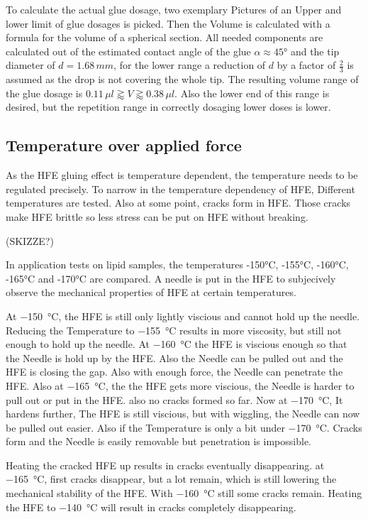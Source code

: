 To calculate the actual glue dosage, two exemplary Pictures of an Upper and lower limit of glue dosages is picked. Then the Volume is calculated with a formula for the volume of a spherical section. All needed components are calculated out of the estimated contact angle of the glue $\alpha \approx 45°$ and the tip diameter of $d = 1.68\,mm$, for the lower range a reduction of $d$ by a factor of $\frac{2}{3}$ is assumed as the drop is not covering the whole tip. The resulting volume range of the glue dosage is $ 0.11\,\mu l \gtrapprox V \gtrapprox 0.38\,\mu l $. Also the lower end of this range is desired, but the repetition range in correctly dosaging lower doses is lower.

\subsection{Temperature over applied force}

As the HFE gluing effect is temperature dependent, the temperature needs to be regulated precisely. To narrow in the temperature dependency of HFE, Different temperatures are tested. Also at some point, cracks form in HFE. Those cracks make HFE brittle so less stress can be put on HFE without breaking.

(SKIZZE?)

In application tests on lipid samples, the temperatures -150°C, -155°C, -160°C, -165°C and -170°C are compared. A needle is put in the HFE to subjecively observe the mechanical properties of HFE at certain temperatures.

At \SI{-150}{\degreeCelsius}, the HFE is still only lightly viscious and cannot hold up the needle. Reducing the Temperature to \SI{-155}{\degreeCelsius} results in more viscosity, but still not enough to hold up the needle. At \SI{-160}{\degreeCelsius} the HFE is viscious enough so that the Needle is hold up by the HFE. Also the Needle can be pulled out and the HFE is closing the gap. Also with enough force, the Needle can penetrate the HFE. Also at \SI{-165}{\degreeCelsius}, the the HFE gets more viscious, the Needle is harder to pull out or put in the HFE. also no cracks formed so far. Now at \SI{-170}{\degreeCelsius}, It hardens further, The HFE is still viscious, but with wiggling, the Needle can now be pulled out easier. Also if the Temperature is only a bit under \SI{-170}{\degreeCelsius}. Cracks form and the Needle is easily removable but penetration is impossible.

Heating the cracked HFE up results in cracks eventually disappearing. at \SI{-165}{\degreeCelsius}, first cracks disappear, but a lot remain, which is still lowering the mechanical stability of the HFE. With \SI{-160}{\degreeCelsius} still some cracks remain. Heating the HFE to \SI{-140}{\degreeCelsius} will result in cracks completely disappearing.

